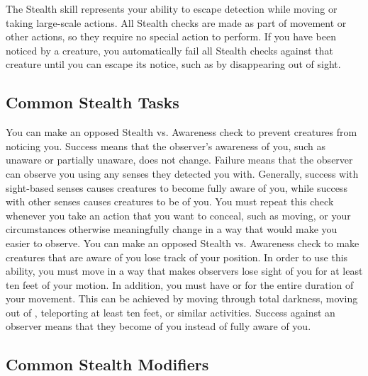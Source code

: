 \newpage
{}
  The Stealth skill represents your ability to escape detection while moving or taking large-scale actions.
  All Stealth checks are made as part of movement or other actions, so they require no special action to perform.
  If you have been noticed by a creature, you automatically fail all Stealth checks against that creature until you can escape its notice, such as by disappearing out of sight.

  \subsection{Common Stealth Tasks}
     You can make an opposed Stealth vs. Awareness check to prevent creatures from noticing you.
    Success means that the observer's awareness of you, such as unaware or partially unaware, does not change.
    Failure means that the observer can observe you using any senses they detected you with.
    Generally, success with sight-based senses causes creatures to become fully aware of you, while success with other senses causes creatures to be \partiallyunaware of you.
    You must repeat this check whenever you take an action that you want to conceal, such as moving, or your circumstances otherwise meaningfully change in a way that would make you easier to observe.
     You can make an opposed Stealth vs. Awareness check to make creatures that are aware of you lose track of your position.
    In order to use this ability, you must move in a way that makes observers lose sight of you for at least ten feet of your motion.
    In addition, you must have  or  for the entire duration of your movement.
    This can be achieved by moving through total darkness, moving out of , teleporting at least ten feet, or similar activities.
    Success against an observer means that they become \partiallyunaware of you instead of fully aware of you.

  \subsection{Common Stealth Modifiers}\label{Common Stealth Modifiers}

